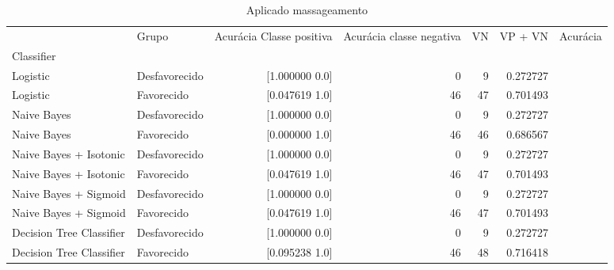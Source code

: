 \begin{table}
    \centering
    \caption{Aplicado massageamento}
    \label{Aplicado massageamento 4}
    \begin{tabular}{llrrrrr}
    \toprule
    {} &          Grupo &  Acurácia Classe positiva &  Acurácia classe negativa &  VN  &  VP + VN  &  Acurácia \\
    Classifier               &                &                           &                           &      &           &           \\
    \midrule
    Logistic                 &  Desfavorecido &                  [1.000000  0.0] &    0 &         9 &  0.272727 \\
    Logistic                 &     Favorecido &                  [0.047619  1.0] &   46 &        47 &  0.701493 \\
    Naive Bayes              &  Desfavorecido &                  [1.000000  0.0] &    0 &         9 &  0.272727 \\
    Naive Bayes              &     Favorecido &                  [0.000000  1.0] &   46 &        46 &  0.686567 \\
    Naive Bayes + Isotonic   &  Desfavorecido &                  [1.000000  0.0] &    0 &         9 &  0.272727 \\
    Naive Bayes + Isotonic   &     Favorecido &                  [0.047619  1.0] &   46 &        47 &  0.701493 \\
    Naive Bayes + Sigmoid    &  Desfavorecido &                  [1.000000  0.0] &    0 &         9 &  0.272727 \\
    Naive Bayes + Sigmoid    &     Favorecido &                  [0.047619  1.0] &   46 &        47 &  0.701493 \\
    Decision Tree Classifier &  Desfavorecido &                  [1.000000  0.0] &    0 &         9 &  0.272727 \\
    Decision Tree Classifier &     Favorecido &                  [0.095238  1.0] &   46 &        48 &  0.716418 \\
    \bottomrule
    \end{tabular}
\end{table}
    
